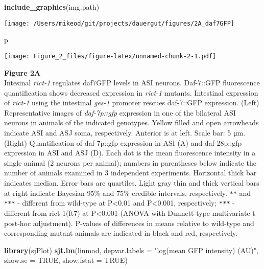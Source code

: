 \documentclass[]{article}
\newenvironment{Shaded}{\begin{snugshade}}{\end{snugshade}}
\newcommand{\KeywordTok}[1]{\textcolor[rgb]{0.13,0.29,0.53}{\textbf{#1}}}
\newcommand{\DataTypeTok}[1]{\textcolor[rgb]{0.13,0.29,0.53}{#1}}
\newcommand{\StringTok}[1]{\textcolor[rgb]{0.31,0.60,0.02}{#1}}
\newcommand{\OtherTok}[1]{\textcolor[rgb]{0.56,0.35,0.01}{#1}}
\newcommand{\NormalTok}[1]{#1}
\begin{document}
\begin{Shaded}
\begin{Highlighting}[]
\KeywordTok{include_graphics}\NormalTok{(img.path)                                   }
\end{Highlighting}
\end{Shaded}

\texttt{[image: /Users/mikeod/git/projects/dauergut/figures/2A\_daf7GFP]}

\begin{Shaded}
\begin{Highlighting}[]
\NormalTok{p}
\end{Highlighting}
\end{Shaded}

\texttt{[image: Figure\_2\_files/figure-latex/unnamed-chunk-2-1.pdf]}

\textbf{Figure 2A}\\
Intesinal \emph{rict-1} regulates daf7GFP levels in ASI neurons.
Daf-7::GFP fluorescence quantification shows decreased expression in
\emph{rict-1} mutants. Intestinal expression of \emph{rict-1} using the
intestinal \emph{ges-1} promoter rescues daf-7::GFP expression. (Left)
Representative images of \emph{daf-7p::gfp} expression in one of the
bilateral ASI neurons in animals of the indicated genotypes. Yellow
filled and open arrowheads indicate ASI and ASJ soma, respectively.
Anterior is at left. Scale bar: 5 μm. (Right) Quantification of
daf-7p::gfp expression in ASI (A) and daf-28p::gfp expression in ASI and
ASJ (D). Each dot is the mean fluorescence intensity in a single animal
(2 neurons per animal); numbers in parentheses below indicate the number
of animals examined in 3 independent experiments. Horizontal thick bar
indicates median. Error bars are quartiles. Light gray thin and thick
vertical bars at right indicate Bayesian 95\% and 75\% credible
intervals, respectively. {\texttt{**}} and {\texttt{***}} - different
from wild-type at P\textless{}0.01 and P\textless{}0.001, respectively;
{\texttt{***}} - different from rict-1(ft7) at P\textless{}0.001 (ANOVA
with Dunnett-type multivariate-t post-hoc adjustment). P-values of
differences in means relative to wild-type and corresponding mutant
animals are indicated in black and red, respectively.

\begin{Shaded}
\begin{Highlighting}[]
\KeywordTok{library}\NormalTok{(sjPlot)}
\KeywordTok{sjt.lm}\NormalTok{(linmod, }\DataTypeTok{depvar.labels =} \StringTok{"log(mean GFP intensity) (AU)"}\NormalTok{, }\DataTypeTok{show.se =} \OtherTok{TRUE}\NormalTok{, }\DataTypeTok{show.fstat =} \OtherTok{TRUE}\NormalTok{)}
\end{Highlighting}
\end{Shaded}
\end{document}
